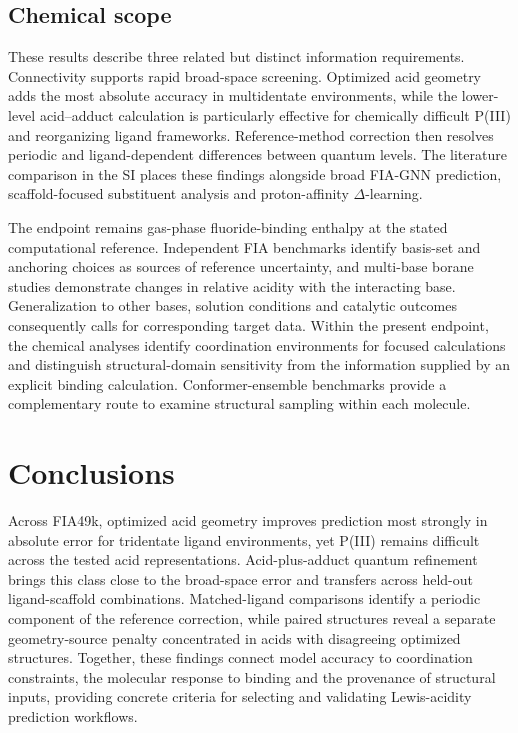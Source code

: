 \subsection{Chemical scope}

These results describe three related but distinct information requirements. Connectivity supports rapid broad-space screening. Optimized acid geometry adds the most absolute accuracy in multidentate environments, while the lower-level acid--adduct calculation is particularly effective for chemically difficult P(III) and reorganizing ligand frameworks. Reference-method correction then resolves periodic and ligand-dependent differences between quantum levels. The literature comparison in the SI places these findings alongside broad FIA-GNN prediction, scaffold-focused substituent analysis and proton-affinity $\Delta$-learning. \cite{sigmund2024fia,fenogli2025boron,bhattacharya2026proton}

The endpoint remains gas-phase fluoride-binding enthalpy at the stated computational reference. Independent FIA benchmarks identify basis-set and anchoring choices as sources of reference uncertainty, \cite{lehmann2025fia} and multi-base borane studies demonstrate changes in relative acidity with the interacting base. \cite{mahdian2026base} Generalization to other bases, solution conditions and catalytic outcomes consequently calls for corresponding target data. Within the present endpoint, the chemical analyses identify coordination environments for focused calculations and distinguish structural-domain sensitivity from the information supplied by an explicit binding calculation. Conformer-ensemble benchmarks \cite{zhu2024marcel} provide a complementary route to examine structural sampling within each molecule.

\section{Conclusions}

Across FIA49k, optimized acid geometry improves prediction most strongly in absolute error for tridentate ligand environments, yet P(III) remains difficult across the tested acid representations. Acid-plus-adduct quantum refinement brings this class close to the broad-space error and transfers across held-out ligand-scaffold combinations. Matched-ligand comparisons identify a periodic component of the reference correction, while paired structures reveal a separate geometry-source penalty concentrated in acids with disagreeing optimized structures. Together, these findings connect model accuracy to coordination constraints, the molecular response to binding and the provenance of structural inputs, providing concrete criteria for selecting and validating Lewis-acidity prediction workflows.
